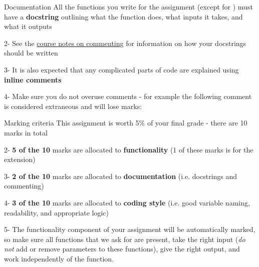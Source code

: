 \documentclass[week3]{csse1001}
\begin{document}
\begin{topic}{Documentation}
All the functions you write for the assignment (except for ) must have a \textbf{docstring} outlining what the function does, what inputs it takes, and what it outputs

\begin{subtopic}{2-}
See the \href{http://csse1001.uqcloud.net/notes/commenting}{course notes on commenting} for information on how your docstrings should be written
\end{subtopic}

\begin{subtopic}{3-}
It is also expected that any complicated parts of code are explained using \textbf{inline comments}
\end{subtopic}

\begin{subtopic}{4-}
Make sure you do not overuse comments - for example the following comment is considered extraneous and will lose marks:\\
\end{subtopic}

\end{topic}

\begin{topic}{Marking criteria}
This assignment is worth 5\% of your final grade - there are 10 marks in total

\begin{subtopic}{2-}
\textbf{5 of the 10} marks are allocated to \textbf{functionality} (1 of these marks is for the extension)
\end{subtopic}

\begin{subtopic}{3-}
\textbf{2 of the 10} marks are allocated to \textbf{documentation} (i.e. docstrings and commenting)
\end{subtopic}

\begin{subtopic}{4-}
\textbf{3 of the 10} marks are allocated to \textbf{coding style} (i.e. good variable naming, readability, and appropriate logic)
\end{subtopic}

\begin{subtopic}{5-}
The functionality component of your assignment will be automatically marked, so make sure all functions that we ask for are present, take the right input (\textit{do not} add or remove parameters to these functions), give the right output, and work independently of the  function.
\end{subtopic}

\end{topic}
\end{document}
